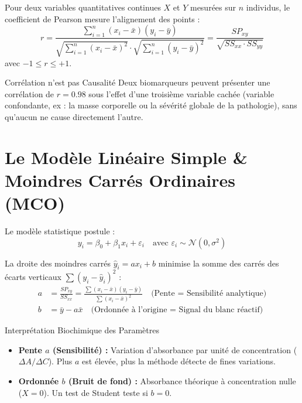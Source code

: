 \documentclass[11pt,a4paper]{article}
\begin{document}
Pour deux variables quantitatives continues $X$ et $Y$ mesurées sur $n$ individus, le coefficient de Pearson mesure l'alignement des points :
\begin{equation*}
  r = \frac{\sum_{i=1}^n (x_i - \bar{x})(y_i - \bar{y})}{\sqrt{\sum_{i=1}^n (x_i - \bar{x})^2} \cdot \sqrt{\sum_{i=1}^n (y_i - \bar{y})^2}} = \frac{SP_{xy}}{\sqrt{SS_{xx} \cdot SS_{yy}}}
\end{equation*}
avec $-1 \le r \le +1$.

\begin{warnbox}{Corrélation n'est pas Causalité}
Deux biomarqueurs peuvent présenter une corrélation de $r = 0.98$ sous l'effet d'une troisième variable cachée (variable confondante, ex : la masse corporelle ou la sévérité globale de la pathologie), sans qu'aucun ne cause directement l'autre.
\end{warnbox}

\section{Le Modèle Linéaire Simple \& Moindres Carrés Ordinaires (MCO)}

Le modèle statistique postule :
\begin{equation*}
  y_i = \beta_0 + \beta_1 x_i + \varepsilon_i \quad \text{avec } \varepsilon_i \sim \mathcal{N}(0, \sigma^2)
\end{equation*}

La droite des moindres carrés $\hat{y}_i = a x_i + b$ minimise la somme des carrés des écarts verticaux $\sum (y_i - \hat{y}_i)^2$ :
\begin{align*}
  a &= \frac{SP_{xy}}{SS_{xx}} = \frac{\sum (x_i - \bar{x})(y_i - \bar{y})}{\sum (x_i - \bar{x})^2} \quad \text{(Pente = Sensibilité analytique)} \\[1mm]
  b &= \bar{y} - a \bar{x} \quad \text{(Ordonnée à l'origine = Signal du blanc réactif)}
\end{align*}

\begin{biobox}{Interprétation Biochimique des Paramètres}
\begin{itemize}[leftmargin=*, label=\faAngleRight]
  \item \textbf{Pente $a$ (Sensibilité) :} Variation d'absorbance par unité de concentration ($\Delta A / \Delta C$). Plus $a$ est élevée, plus la méthode détecte de fines variations.
  \item \textbf{Ordonnée $b$ (Bruit de fond) :} Absorbance théorique à concentration nulle ($X = 0$). Un test de Student teste si $b = 0$.
\end{itemize}
\end{biobox}
\end{document}
